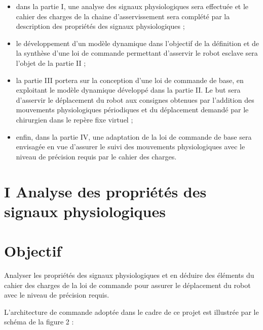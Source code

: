 \begin{itemize}
  \item dans la partie I, une analyse des signaux physiologiques sera effectuée et le cahier des charges de la chaine d'asservissement sera complété par la description des propriétés des signaux physiologiques ;
  \item le développement d'un modèle dynamique dans l'objectif de la définition et de la synthèse d'une loi de commande permettant d'asservir le robot esclave sera l'objet de la partie II ;
  \item la partie III portera sur la conception d'une loi de commande de base, en exploitant le modèle dynamique développé dans la partie II. Le but sera d'asservir le déplacement du robot aux consignes obtenues par l'addition des mouvements physiologiques périodiques et du déplacement demandé par le chirurgien dans le repère fixe virtuel ;
  \item enfin, dans la partie IV, une adaptation de la loi de commande de base sera envisagée en vue d'assurer le suivi des mouvements physiologiques avec le niveau de précision requis par le cahier des charges.
\end{itemize}

\section*{I Analyse des propriétés des signaux physiologiques}
\section*{Objectif}
Analyser les propriétés des signaux physiologiques et en déduire des éléments du cahier des charges de la loi de commande pour assurer le déplacement du robot avec le niveau de précision requis.

L'architecture de commande adoptée dans le cadre de ce projet est illustrée par le schéma de la figure 2 :

